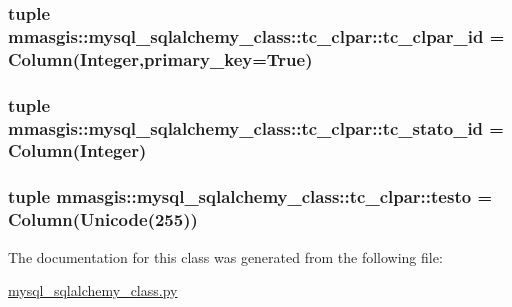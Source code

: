 \label{classmmasgis_1_1mysql__sqlalchemy__class_1_1tc__clpar_ade55911b6c8ae5145047c0a9e77a8abb}
\hypertarget{classmmasgis_1_1mysql__sqlalchemy__class_1_1tc__clpar_a2a1686c28f4fc4303c082bf6eccffbc9}{
\subsubsection[{tc\_\-clpar\_\-id}]{\setlength{\rightskip}{0pt plus 5cm}tuple {\bf mmasgis::mysql\_\-sqlalchemy\_\-class::tc\_\-clpar::tc\_\-clpar\_\-id} = Column(Integer,primary\_\-key=True)}}
\label{classmmasgis_1_1mysql__sqlalchemy__class_1_1tc__clpar_a2a1686c28f4fc4303c082bf6eccffbc9}
\hypertarget{classmmasgis_1_1mysql__sqlalchemy__class_1_1tc__clpar_a9e856ce8a373e82123d1cfa50695ff8b}{
\subsubsection[{tc\_\-stato\_\-id}]{\setlength{\rightskip}{0pt plus 5cm}tuple {\bf mmasgis::mysql\_\-sqlalchemy\_\-class::tc\_\-clpar::tc\_\-stato\_\-id} = Column(Integer)}}
\label{classmmasgis_1_1mysql__sqlalchemy__class_1_1tc__clpar_a9e856ce8a373e82123d1cfa50695ff8b}
\hypertarget{classmmasgis_1_1mysql__sqlalchemy__class_1_1tc__clpar_a5b4d74cfadaa49b9a580a85758bacac1}{
\subsubsection[{testo}]{\setlength{\rightskip}{0pt plus 5cm}tuple {\bf mmasgis::mysql\_\-sqlalchemy\_\-class::tc\_\-clpar::testo} = Column(Unicode(255))}}
\label{classmmasgis_1_1mysql__sqlalchemy__class_1_1tc__clpar_a5b4d74cfadaa49b9a580a85758bacac1}


The documentation for this class was generated from the following file:\begin{DoxyCompactItemize}
\item 
\hyperlink{mysql__sqlalchemy__class_8py}{mysql\_\-sqlalchemy\_\-class.py}\end{DoxyCompactItemize}
